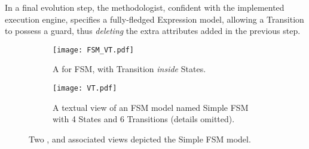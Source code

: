 In a final evolution step, the methodologist, confident with the implemented
execution engine, specifies a fully-fledged \textsf{Expression} model,
allowing a \textsf{Transition} to possess a \textsf{guard}, thus \emph{deleting}
the extra attributes added in the previous step.


\begin{figure}
    \centering
    \begin{subfigure}[b]{\columnwidth}
			\centering
      \texttt{[image: FSM\_VT.pdf]}
      \caption{A \viewtype for \textsf{FSM}, with \textsf{Transition} \emph{inside} \textsf{State}s.}
      \label{fig:VT:VMM}
    \end{subfigure}
    \hfill
    \begin{subfigure}[b]{\columnwidth}
			\centering
      \texttt{[image: VT.pdf]}
      \caption{A textual view of an \textsf{FSM} model named \textsf{Simple FSM} with 4 \textsf{States} and 6 \textsf{Transitions} (details omitted).}
      \label{fig:VT:TM}
    \end{subfigure}
    \caption{Two \viewtypes, and associated views depicted the \textsf{Simple FSM} model.}
    \label{fig:VT}
\end{figure}
